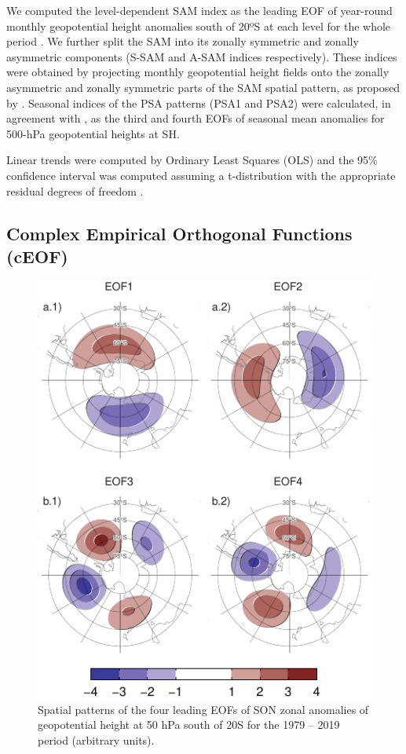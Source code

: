 \documentclass[pdflatex,sn-basic]{sn-jnl}
\theoremstyle{thmstyleone}%
\theoremstyle{thmstyletwo}%
\theoremstyle{thmstylethree}%
\begin{document}
We computed the level-dependent SAM index as the leading EOF of year-round monthly geopotential height anomalies south of 20ºS at each level for the whole period \citep{baldwin2009}.
We further split the SAM into its zonally symmetric and zonally asymmetric components (S-SAM and A-SAM indices respectively).
These indices were obtained by projecting monthly geopotential height fields onto the zonally asymmetric and zonally symmetric parts of the SAM spatial pattern, as proposed by \citet{campitelli2022}.
Seasonal indices of the PSA patterns (PSA1 and PSA2) were calculated, in agreement with \citet{mo2001}, as the third and fourth EOFs of seasonal mean anomalies for 500-hPa geopotential heights at SH.

Linear trends were computed by Ordinary Least Squares (OLS) and the 95\% confidence interval was computed assuming a t-distribution with the appropriate residual degrees of freedom \citep{wilks2011}.

\hypertarget{complex-empirical-orthogonal-functions-ceof}{%
\subsection{Complex Empirical Orthogonal Functions (cEOF)}\label{complex-empirical-orthogonal-functions-ceof}}



\begin{figure}
\centering
\includegraphics{../figures/eof-naive-1.pdf}
\caption{\label{fig:eof-naive}Spatial patterns of the four leading EOFs of SON zonal anomalies of geopotential height at 50 hPa south of 20\degree S for the 1979 -- 2019 period (arbitrary units).}
\end{figure}
\end{document}
